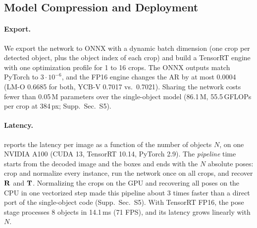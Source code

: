 \subsection{Model Compression and Deployment}
\label{sec:exp:deployment}

\paragraph{Export.}
We export the network to ONNX with a dynamic batch dimension (one crop per detected object, plus
the object index of each crop) and build a TensorRT engine with one optimization profile for 1 to
16 crops. The ONNX outputs match PyTorch to $3 \cdot 10^{-6}$, and the FP16 engine changes the AR
by at most 0.0004 (LM-O 0.6685 for both, YCB-V 0.7017 vs.\ 0.7021). Sharing the network costs
fewer than 0.05\,M parameters over the single-object model (86.1\,M, 55.5\,GFLOPs per crop at
384\,px; Supp.~Sec.~S5).

\paragraph{Latency.}
 reports the latency per image as a function of the number of objects $N$, on one
NVIDIA A100 (CUDA 13, TensorRT 10.14, PyTorch 2.9). The \emph{pipeline} time starts from the decoded
image and the boxes and ends with the $N$ absolute poses: crop and normalize every instance, run
the network once on all crops, and recover $\mathbf{R}$ and $\mathbf{T}$. Normalizing the crops on the GPU and
recovering all poses on the CPU in one vectorized step made this pipeline about 3 times faster than
a direct port of the single-object code (Supp.~Sec.~S5). With TensorRT FP16, the pose stage
processes 8 objects in 14.1\,ms (71 FPS), and its latency grows linearly with $N$.

